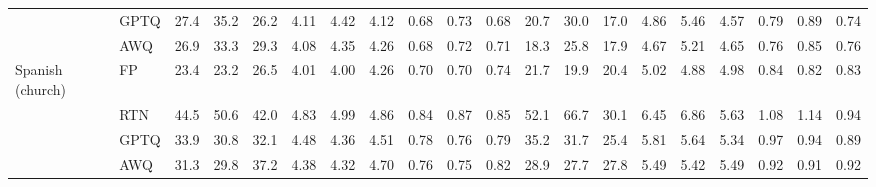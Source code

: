 \begin{landscape}
\begin{longtable}{llrrrrrrrrrrrrrrrrrr}
 & GPTQ & \cellcolor{loss!1}27.4 & \cellcolor{loss!1}35.2 & \cellcolor{loss!1}26.2 & \cellcolor{loss!9}4.11 & \cellcolor{loss!12}4.42 & \cellcolor{loss!6}4.12 & \cellcolor{loss!8}0.68 & \cellcolor{loss!10}0.73 & \cellcolor{loss!5}0.68 & \cellcolor{loss!0}20.7 & \cellcolor{loss!0}30.0 & \cellcolor{loss!0}17.0 & \cellcolor{loss!3}4.86 & \cellcolor{loss!4}5.46 & \cellcolor{loss!1}4.57 & \cellcolor{loss!6}0.79 & \cellcolor{loss!7}0.89 & \cellcolor{loss!3}0.74 \\
 & AWQ & \cellcolor{loss!1}26.9 & \cellcolor{loss!1}33.3 & \cellcolor{loss!1}29.3 & \cellcolor{loss!8}4.08 & \cellcolor{loss!10}4.35 & \cellcolor{loss!11}4.26 & \cellcolor{loss!8}0.68 & \cellcolor{loss!8}0.72 & \cellcolor{loss!9}0.71 & \cellcolor{loss!0}18.3 & \cellcolor{loss!0}25.8 & \cellcolor{loss!0}17.9 & \cellcolor{loss!2}4.67 & \cellcolor{loss!3}5.21 & \cellcolor{loss!2}4.65 & \cellcolor{loss!4}0.76 & \cellcolor{loss!5}0.85 & \cellcolor{loss!4}0.76 \\
\midrule
Spanish (church) & FP & 23.4 & 23.2 & 26.5 & 4.01 & 4.00 & 4.26 & 0.70 & 0.70 & 0.74 & 21.7 & 19.9 & 20.4 & 5.02 & 4.88 & 4.98 & 0.84 & 0.82 & 0.83 \\
 & RTN & \cellcolor{loss!3}44.5 & \cellcolor{loss!4}50.6 & \cellcolor{loss!2}42.0 & \cellcolor{loss!27}4.83 & \cellcolor{loss!32}4.99 & \cellcolor{loss!20}4.86 & \cellcolor{loss!23}0.84 & \cellcolor{loss!28}0.87 & \cellcolor{loss!18}0.85 & \cellcolor{loss!1}52.1 & \cellcolor{loss!1}66.7 & \cellcolor{loss!0}30.1 & \cellcolor{loss!7}6.45 & \cellcolor{loss!9}6.86 & \cellcolor{loss!3}5.63 & \cellcolor{loss!13}1.08 & \cellcolor{loss!17}1.14 & \cellcolor{loss!6}0.94 \\
 & GPTQ & \cellcolor{loss!2}33.9 & \cellcolor{loss!1}30.8 & \cellcolor{loss!1}32.1 & \cellcolor{loss!15}4.48 & \cellcolor{loss!12}4.36 & \cellcolor{loss!8}4.51 & \cellcolor{loss!13}0.78 & \cellcolor{loss!10}0.76 & \cellcolor{loss!8}0.79 & \cellcolor{loss!0}35.2 & \cellcolor{loss!0}31.7 & \cellcolor{loss!0}25.4 & \cellcolor{loss!4}5.81 & \cellcolor{loss!4}5.64 & \cellcolor{loss!2}5.34 & \cellcolor{loss!7}0.97 & \cellcolor{loss!7}0.94 & \cellcolor{loss!3}0.89 \\
 & AWQ & \cellcolor{loss!1}31.3 & \cellcolor{loss!1}29.8 & \cellcolor{loss!2}37.2 & \cellcolor{loss!12}4.38 & \cellcolor{loss!10}4.32 & \cellcolor{loss!14}4.70 & \cellcolor{loss!10}0.76 & \cellcolor{loss!8}0.75 & \cellcolor{loss!13}0.82 & \cellcolor{loss!0}28.9 & \cellcolor{loss!0}27.7 & \cellcolor{loss!0}27.8 & \cellcolor{loss!2}5.49 & \cellcolor{loss!3}5.42 & \cellcolor{loss!2}5.49 & \cellcolor{loss!4}0.92 & \cellcolor{loss!5}0.91 & \cellcolor{loss!5}0.92 \\

\end{longtable}
\end{landscape}
